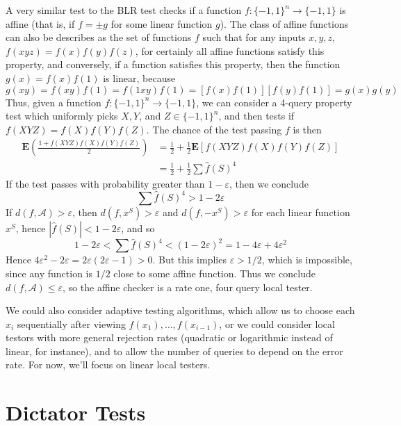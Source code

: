 \begin{example}
    A very similar test to the BLR test checks if a function $f: \{ -1, 1 \}^n \to \{ -1, 1 \}$ is affine (that is, if $f = \pm g$ for some linear function $g$). The class of affine functions can also be describes as the set of functions $f$ such that for any inputs $x,y,z$, $f(xyz) = f(x)f(y)f(z)$, for certainly all affine functions satisfy this property, and conversely, if a function satisfies this property, then the function $g(x) = f(x) f(1)$ is linear, because
    \[ g(xy) = f(xy) f(1) = f(1xy) f(1) = [f(x) f(1)] [f(y) f(1)] = g(x) g(y) \]
    Thus, given a function $f: \{ -1, 1 \}^n \to \{ -1, 1 \}$, we can consider a 4-query property test which uniformly picks $X,Y$, and $Z \in \{ -1, 1 \}^n$, and then tests if $f(XYZ) = f(X)f(Y)f(Z)$. The chance of the test passing $f$ is then
    \begin{align*}
        \mathbf{E} \left( \frac{1 + f(XYZ) f(X) f(Y) f(Z)}{2} \right) &= \frac{1}{2} + \frac{1}{2} \mathbf{E}[f(XYZ) f(X) f(Y) f(Z)]\\
        &= \frac{1}{2} + \frac{1}{2} \sum \widehat{f}(S)^4
    \end{align*}
    If the test passes with probability greater than $1 - \varepsilon$, then we conclude
    \[ \sum \widehat{f}(S)^4 > 1 - 2 \varepsilon \]
    If $d(f,\mathcal{A}) > \varepsilon$, then $d(f,x^S) > \varepsilon$ and $d(f,-x^S) > \varepsilon$ for each linear function $x^S$, hence $|\widehat{f}(S)| < 1 - 2 \varepsilon$, and so
    \[ 1 - 2 \varepsilon < \sum \widehat{f}(S)^4 < (1 - 2 \varepsilon)^2 = 1 - 4 \varepsilon + 4 \varepsilon^2 \]
    Hence $4 \varepsilon^2 - 2 \varepsilon = 2\varepsilon(2\varepsilon - 1) > 0$. But this implies $\varepsilon > 1/2$, which is impossible, since any function is $1/2$ close to some affine function. Thus we conclude $d(f,\mathcal{A}) \leq \varepsilon$, so the affine checker is a rate one, four query local tester.
\end{example}

We could also consider adaptive testing algorithms, which allow us to choose each $x_i$ sequentially after viewing $f(x_1), \dots, f(x_{i-1})$, or we could consider local testors with more general rejection rates (quadratic or logarithmic instead of linear, for instance), and to allow the number of queries to depend on the error rate. For now, we'll focus on linear local testers.

\section{Dictator Tests}

